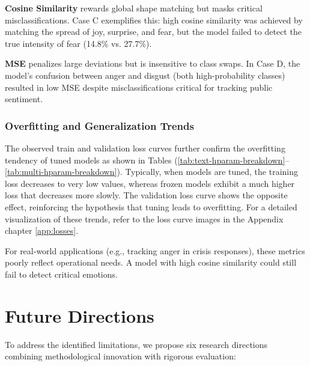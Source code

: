 \textbf{Cosine Similarity} rewards global shape matching but masks critical misclassifications. Case C exemplifies this: high cosine similarity was achieved by matching the spread of joy, surprise, and fear, but the model failed to detect the true intensity of fear (14.8\% vs. 27.7\%).
\newline

\textbf{MSE} penalizes large deviations but is insensitive to class swaps. In Case D, the model’s confusion between anger and disgust (both high-probability classes) resulted in low MSE despite misclassifications critical for tracking public sentiment.

\subsubsection*{Overfitting and Generalization Trends}
The observed train and validation loss curves further confirm the overfitting tendency of tuned models as shown in Tables (\ref{tab:text-hparam-breakdown}--\ref{tab:multi-hparam-breakdown}). Typically, when models are tuned, the training loss decreases to very low values, whereas frozen models exhibit a much higher loss that decreases more slowly. The validation loss curve shows the opposite effect, reinforcing the hypothesis that tuning leads to overfitting. For a detailed visualization of these trends, refer to the loss curve images in the Appendix chapter \ref{app:losses}.
\newline

For real-world applications (e.g., tracking anger in crisis responses), these metrics poorly reflect operational needs. A model with high cosine similarity could still fail to detect critical emotions.


\section{Future Directions}
To address the identified limitations, we propose six research directions combining methodological innovation with rigorous evaluation:


